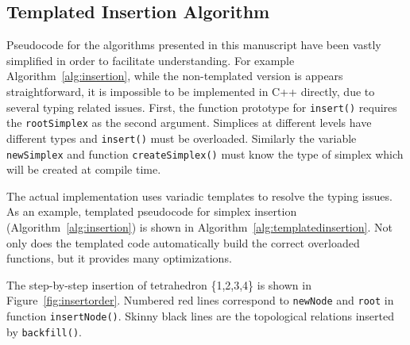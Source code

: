 \subsection{Templated Insertion Algorithm}

\par Pseudocode for the algorithms presented in this manuscript have been vastly simplified in order to facilitate understanding.
For example Algorithm~\ref{alg:insertion}, while the non-templated version is appears straightforward, it is impossible to be implemented in C++ directly, due to several typing related issues.
First, the function prototype for \verb|insert()| requires the \verb|rootSimplex| as the second argument.
Simplices at different levels have different types and \verb|insert()| must be overloaded.
Similarly the variable \verb|newSimplex| and function \verb|createSimplex()| must know the type of simplex which will be created at compile time.

\par The actual implementation uses variadic templates to resolve the typing issues.
As an example, templated pseudocode for simplex insertion (Algorithm~\ref{alg:insertion}) is shown in Algorithm~\ref{alg:templatedinsertion}.
Not only does the templated code automatically build the correct overloaded functions, but it provides many optimizations.

\par The step-by-step insertion of tetrahedron \{1,2,3,4\} is shown in Figure~\ref{fig:insertorder}.
Numbered red lines correspond to \verb|newNode| and \verb|root| in function \verb|insertNode()|.
Skinny black lines are the topological relations inserted by \verb|backfill()|.

